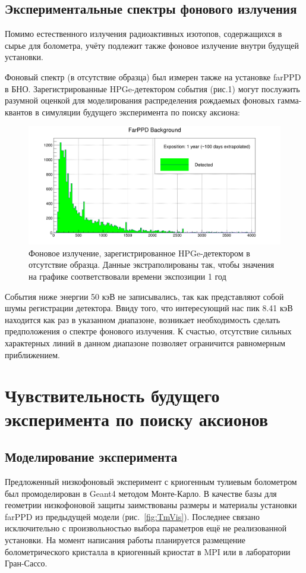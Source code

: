 \documentclass[a4paper,article,14pt]{extarticle}
\begin{document}
\subsection{Экспериментальные спектры фонового излучения}
Помимо естественного излучения радиоактивных изотопов, содержащихся в сырье для болометра, учёту подлежит также фоновое излучение внутри будущей установки.

Фоновый спектр (в отсутствие образца) был измерен также на установке farPPD в БНО. Зарегистрированные HPGe-детектором события (рис.1) могут послужить разумной оценкой для моделирования распределения рождаемых фоновых гамма-квантов в симуляции будущего эксперимента по поиску аксиона:

\begin{figure}[h]
    \centering
    \includegraphics[width = \textwidth]{images/FarPPD_background.png}
    \caption{Фоновое излучение, зарегистрированное HPGe-детектором в отсутствие образца. Данные экстраполированы так, чтобы значения на графике соответствовали времени экспозиции 1 год}
    \label{fon}
\end{figure}

События ниже энергии 50 кэВ не записывались, так как представляют собой шумы регистрации детектора. Ввиду того, что интересующий нас пик 8.41 кэВ находится как раз в указанном диапазоне, возникает необходимость сделать предположения о спектре фонового излучения. К счастью, отсутствие сильных характерных линий в данном диапазоне позволяет ограничится равномерным приближением.

\newpage
\section{Чувствительность будущего эксперимента по поиску аксионов}

\subsection{Моделирование эксперимента}
Предложенный низкофоновый эксперимент с криогенным тулиевым болометром был промоделирован в Geant4 методом Монте-Карло.
В качестве базы для геометрии низкофоновой защиты заимствованы размеры и материалы установки farPPD из предыдущей модели (рис.~\ref{fig:TmVis}).
Последнее связано исключительно с произвольностью выбора параметров ещё не реализованной установки.
На момент написания работы планируется размещение болометрического кристалла в криогенный криостат в MPI или в лаборатории Гран-Сассо.
\end{document}

